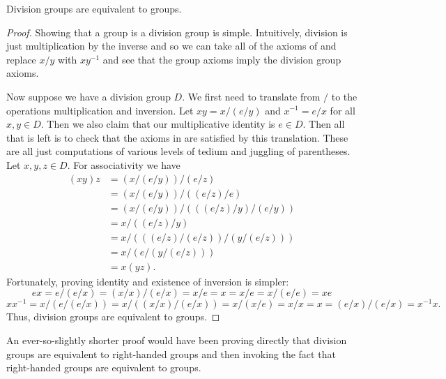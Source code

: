 \documentclass{article}
\begin{document}
\begin{theorem}\label{thrm:div-grp_is_grp}
  Division groups are equivalent to groups.
\end{theorem}
\begin{proof}
  Showing that a group is a division group is simple.
  Intuitively, division is just multiplication by the inverse and so we can take all of the axioms of  and replace $x / y$ with $x y^{-1}$ and see that the group axioms imply the division group axioms.

  Now suppose we have a division group $D$.
  We first need to translate from $/$ to the operations multiplication and inversion.
  Let $xy = x / (e / y)$ and $x^{-1} = e / x$ for all $x, y \in D$.
  Then we also claim that our multiplicative identity is $e \in D$.
  Then all that is left is to check that the axioms in  are satisfied by this translation.
  These are all just computations of various levels of tedium and juggling of parentheses.
  Let $x, y, z \in D$.
  For associativity we have
  \begin{align*}
    (xy)z &= (x / (e / y)) / (e / z)                    \tag{Translation}     \\
          &= (x / (e / y)) / ((e / z) / e)              \tag{D-Identity}      \\
          &= (x / (e / y)) / (((e / z) / y) / (e / y))  \tag{D-Cancellation}  \\
          &= x / ((e / z) / y)                          \tag{D-Cancellation}  \\
          &= x / (((e / z) / (e / z)) / (y / (e / z)))  \tag{D-Cancellation}  \\
          &= x / (e / (y / (e / z)))                    \tag{D-Inversion}  \\
          &= x(yz).                                     \tag{Translation}
  \end{align*}
  Fortunately, proving identity and existence of inversion is simpler:
  \[
    ex = e / (e / x) = (x / x) / (e / x) = x / e = x = x / e = x / (e / e) = xe
  \]
  \[
    x x^{-1} = x / (e / (e / x)) = x / ((x / x) / (e / x)) = x / (x / e) = x / x = x = (e / x) / (e / x) = x^{-1} x.
  \]
  Thus, division groups are equivalent to groups.
\end{proof}
An ever-so-slightly shorter proof would have been proving directly that division groups are equivalent to right-handed groups and then invoking the fact that right-handed groups are equivalent to groups.
\end{document}
